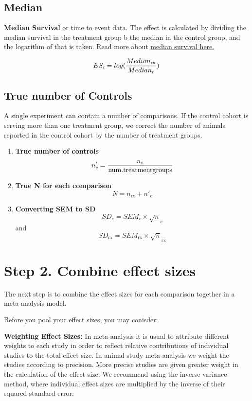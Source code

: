 \documentclass[
]{book}
\begin{document}
\hypertarget{median}{%
\subsection{Median}\label{median}}

\textbf{Median Survival} or time to event data. The effect is calculated by dividing the median survival in the treatment group b the median in the control group, and the logarithm of that is taken. Read more about \href{https://systematicreviewsjournal.biomedcentral.com/articles/10.1186/s13643-021-01824-0}{median survival here.}

\[ ES_i = log (\frac{Median_{\rm rx}}{Median_c} ) \]

\hypertarget{true-number-of-controls}{%
\subsection{True number of Controls}\label{true-number-of-controls}}

A single experiment can contain a number of comparisons. If the control cohort is serving more than one treatment group, we correct the number of animals reported in the control cohort by the number of treatment groups.

\begin{enumerate}
\def\labelenumi{(\arabic{enumi})}
\item
  \textbf{True number of controls}
  \[n'_c = \frac{n_c}{{\rm num. treatment groups}}\]
\item
  \textbf{True N for each comparison}
  \[N = n_{\text{rx}} + n'_c\]
\item
  \textbf{Converting SEM to SD}
  \[ SD_c = SEM_c \times \sqrt n_c \] and \[SD_{\text{rx}} = SEM_{\text{rx}} \times \sqrt n_{\text{rx}} \]
\end{enumerate}

\hypertarget{step-2.-combine-effect-sizes}{%
\section{Step 2. Combine effect sizes}\label{step-2.-combine-effect-sizes}}

The next step is to combine the effect sizes for each comparison together in a meta-analysis model.

Before you pool your effect sizes, you may conisder:

\textbf{Weighting Effect Sizes:}
In meta-analysis it is usual to attribute different weights to each study in order to reflect relative contributions of individual studies to the total effect size. In animal study meta-analysis we weight the studies according to precision. More precise studies are given greater weight in the calculation of the effect size. We recommend using the inverse variance method, where individual effect sizes are multiplied by the inverse of their squared standard error:
\end{document}
